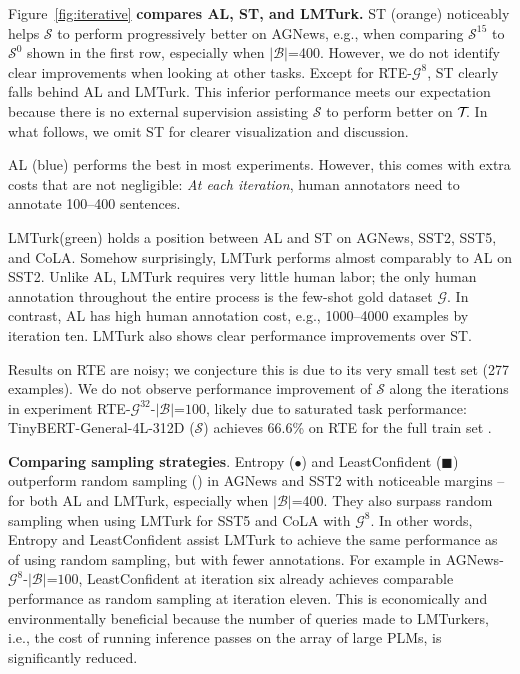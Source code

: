 \documentclass[11pt]{article}
\def\tasksymbol{$\mathcal{T\mkern-5mu}$\xspace}
\def\md{LMTurk\xspace}
\def\mdrs{LMTurkers\xspace}
\def\figref#1{Figure~\ref{fig:#1}}
\begin{document}
\figref{iterative}
\textbf{compares AL, ST, and \md.}
ST (orange)
noticeably helps $\mathcal{S}$ to perform
progressively better on AGNews, e.g., when
comparing
$\mathcal{S}^{15}$ to $\mathcal{S}^{0}$
shown in
the first row, especially when $|\mathcal{B}|$=400.
However, we do not
identify clear
improvements
when looking at other tasks.
Except for RTE-$\mathcal{G}^{8}$,
ST clearly falls behind AL and \md.
This inferior performance
meets our expectation because
there is no
external supervision assisting
$\mathcal{S}$ to perform better
on \tasksymbol.
In what follows,
we omit ST for
clearer visualization and discussion.

AL (blue) performs
the best in most experiments.
However, this comes with extra
costs that are
not negligible: \emph{At each iteration},
human annotators need to
annotate 100--400 sentences.


\md (green) holds
a position
between AL and ST
on AGNews, SST2, SST5, and CoLA.
Somehow surprisingly,
\md performs almost comparably
to AL on SST2.
Unlike AL, \md
requires very little human labor;
the only human annotation
throughout the
entire process is
the
few-shot gold dataset
$\mathcal{G}$.
In contrast,
AL has high
human annotation cost, e.g.,
1000--4000 examples
by iteration ten.
\md also shows clear performance
improvements over ST.

Results on RTE are noisy;
we conjecture this is
due to its very small test set
(277 examples).
We do not observe
performance
improvement of $\mathcal{S}$
along the iterations
in experiment
RTE-$\mathcal{G}^{32}$-$|\mathcal{B}|$=$100$,
likely due to 
saturated task performance:
TinyBERT-General-4L-312D ($\mathcal{S}$)
achieves 66.6\% on RTE for the full train
set \citep{jiao-etal-2020-tinybert}.


\textbf{Comparing sampling strategies}.
Entropy ($\bullet$) and
LeastConfident (\tiny$\blacksquare$\normalsize)
outperform random sampling (\tiny\XSolidBold\normalsize)
in AGNews and SST2 with noticeable margins --
for both AL and \md, especially when $|\mathcal{B}|$=400.
They also surpass random sampling
when using \md for SST5 and CoLA with $\mathcal{G}^8$. 
In other words, Entropy and LeastConfident
assist \md to achieve the same
performance as of
using random sampling,
but with fewer annotations.
For example
in AGNews-$\mathcal{G}^8$-$|\mathcal{B}|$=$100$,
LeastConfident at iteration six already
achieves comparable performance as random
sampling at iteration eleven.
This is
economically and environmentally
beneficial because
the number of queries made to \mdrs,
i.e., the cost of running
inference passes on
the array of large PLMs,
is significantly reduced.
\end{document}
